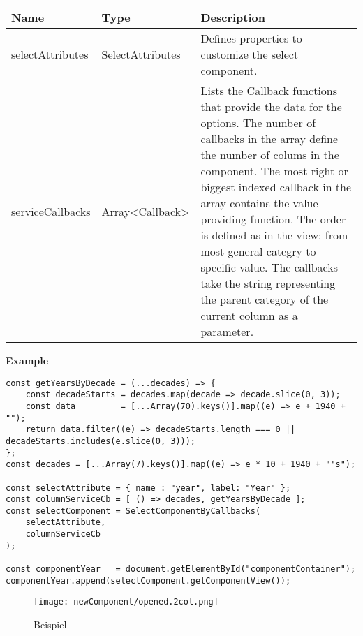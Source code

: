 \begin{table}[!htb] 
    \label{api:selectComponentByCallbacksParameter}
    \footnotesize
    \setlength\extrarowheight{4pt}
    \begin{tabular}{ p{3.5cm} p{3.5cm} p{5.5cm} }
        \toprule[1.2pt]
        \textbf{Name}    & \textbf{Type}    & \textbf{Description} \\
        \midrule
        selectAttributes & SelectAttributes & Defines properties to customize the select component. \\
        serviceCallbacks & Array<Callback>  & Lists the Callback functions that provide the data for the options. 
                                              The number of callbacks in the array define the number of colums in the component. 
                                              The most right or biggest indexed callback in the array contains the value providing function. 
                                              The order is defined as in the view: from most general categry to specific value.
                                              The callbacks take the string representing the parent category of the current column as a parameter. \\
        \bottomrule[1.2pt]
    \end{tabular}
\end{table}

\vspace*{6pt}
\noindent
\textbf{Example}

\begin{lstlisting}[style = htmlcssjs, label = api:selectComponentCbExample]
const getYearsByDecade = (...decades) => {
    const decadeStarts = decades.map(decade => decade.slice(0, 3));
    const data         = [...Array(70).keys()].map((e) => e + 1940 + "");
    return data.filter((e) => decadeStarts.length === 0 || decadeStarts.includes(e.slice(0, 3)));
};
const decades = [...Array(7).keys()].map((e) => e * 10 + 1940 + "'s");

const selectAttribute = { name : "year", label: "Year" };
const columnServiceCb = [ () => decades, getYearsByDecade ];
const selectComponent = SelectComponentByCallbacks(
    selectAttribute,
    columnServiceCb
);

const componentYear   = document.getElementById("componentContainer");
componentYear.append(selectComponent.getComponentView());
\end{lstlisting}
    
\begin{figure}[!htb]
    \centering
    \texttt{[image: newComponent/opened.2col.png]}
    \caption*{\centering Beispiel }
    \label{api:selectComponentCbImg}
\end{figure}


